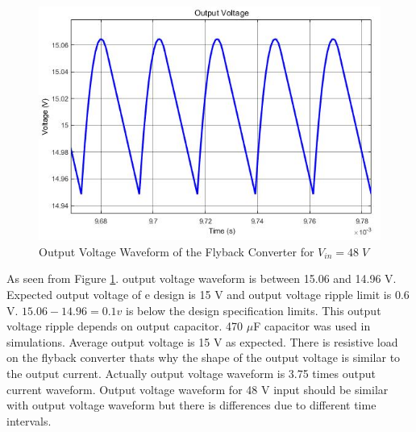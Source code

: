 \begin{figure}[H]
\begin{center}
\includegraphics[width=1\textwidth]{output_voltage_48.jpg}
\caption{Output Voltage Waveform of the Flyback Converter for $ V_{in} = 48\;V $}
\label{fig:outvolt48}
\end{center}
\end{figure}

As seen from Figure \ref{fig:outvolt48}. output voltage waveform is between 15.06 and 14.96 V. Expected output voltage of e design is 15 V and output voltage ripple limit is 0.6 V. $15.06-14.96=0.1 v$ is below the design specification limits. This output voltage ripple  depends on output capacitor. 470 $\mu$F capacitor was used in simulations. Average output voltage is 15 V as expected. There is resistive load on the flyback converter thats why the shape of the output voltage is similar to the output current. Actually output voltage waveform is 3.75 times output current waveform. Output voltage waveform for 48 V input should be similar with output voltage waveform but there is differences due to different time intervals.